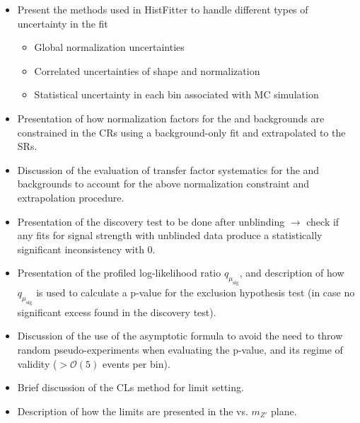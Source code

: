 \begin{itemize}
\item Present the methods used in HistFitter to handle different types of uncertainty in the fit
\begin{itemize}
\item Global normalization uncertainties
\item Correlated uncertainties of shape and normalization
\item Statistical uncertainty in each bin associated with MC simulation
\end{itemize}
\end{itemize}
\begin{itemize}
\item Presentation of how normalization factors for the \wjets and \ttbar backgrounds are constrained in the CRs using a background-only fit and extrapolated to the SRs. 
\item Discussion of the evaluation of transfer factor systematics for the \wjets and \ttbar backgrounds to account for the above normalization constraint and extrapolation procedure.
\item Presentation of the discovery test to be done after unblinding $\rightarrow$ check if any fits for signal strength with unblinded data produce a statistically significant inconsistency with 0.
\item Presentation of the profiled log-likelihood ratio $q_{\mu_\text{sig}}$, and description of how $q_{\mu_\text{sig}}$ is used to calculate a p-value for the exclusion hypothesis test (in case no significant excess found in the discovery test).
\item Discussion of the use of the asymptotic formula to avoid the need to throw random pseudo-experiments when evaluating the p-value, and its regime of validity ($>\mathcal{O}(5)$ events per bin).
\item Brief discussion of the CLs method for limit setting.
\item Description of how the limits are presented in the \ms vs. $m_{Z'}$ plane.
\end{itemize}

